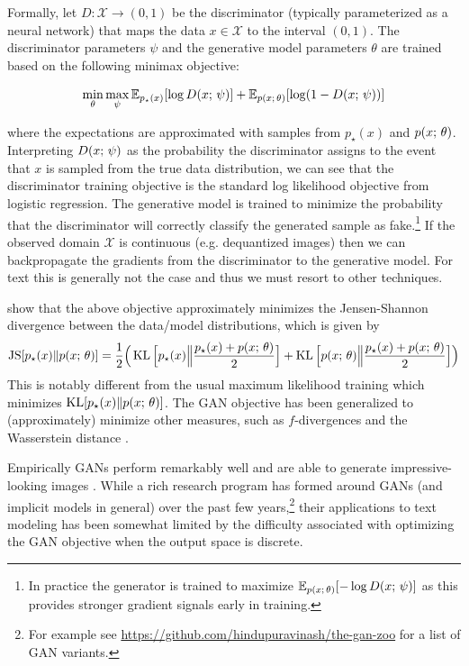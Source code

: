 \documentclass{article}
\begin{document}
Formally, let $D: \mathcal{X} \to (0, 1)$ be the discriminator (typically parameterized as 
a neural network) that maps the data  $x \in \mathcal{X}$ to the interval $(0,1)$. The discriminator parameters $\psi$ and the generative model parameters $\theta$ are trained based on the following
minimax objective:

\[ \min_\theta \max_\psi \mathbb{E}_{p_\star(x)}[\log D(x ; \, \psi)] + \mathbb{E}_{p(x ; \, \theta)}[\log ( 1 - D(x ; \, \psi))]\]

where the expectations are approximated with samples from $p_\star(x)$ and $p(x ; \, \theta)$. Interpreting $D(x ; \, \psi)$ as the probability the discriminator assigns to the event that $x$ is sampled from the true data distribution, we can see that 
the discriminator training objective is the standard log likelihood objective from 
logistic regression. The generative model is trained to minimize the probability that the discriminator will correctly classify the generated sample as fake.\footnote{In practice the generator is trained to maximize $\mathbb{E}_{p(x; \,\theta)}[- \log D(x ; \, \psi)]$ as this provides stronger gradient signals early in training.} If the observed domain $\mathcal{X}$ is continuous (e.g. dequantized images) then we can backpropagate the gradients from the discriminator to the
generative model. For text this is generally not the case and thus we must resort to
other techniques.

\cite{goodfellow2014generative} show that the above objective
approximately minimizes the Jensen-Shannon divergence between the data/model distributions, which is
given by
\[ \operatorname*{JS}[p_\star(x) \Vert p(x ; \, \theta)] = \frac{1}{2}\Big(\operatorname*{KL}\Big[p_\star(x) \Big\Vert \frac{p_\star(x) + p(x ; \, \theta)}{2} \Big] + \operatorname*{KL}\Big[p(x ; \, \theta) \Big\Vert \frac{p_\star(x) + p(x ; \, \theta)}{2} \Big]  \Big) \]
This is notably different from the usual maximum likelihood training which minimizes $\operatorname*{KL}[p_\star(x) \Vert p(x ; \, \theta)]$.
The GAN objective has been generalized to (approximately) minimize other measures, 
such as $f$-divergences \citep{nowozin2016f} and the Wasserstein distance \citep{arjovsky2017wasserstein,tolstikhin2017wasserstein}. 

Empirically GANs perform remarkably well and are able to generate impressive-looking
images \citep{Radford2016,salimans2016,zhang2017stack,miyato2018,Karras2018prog}. While a rich
research program has formed around GANs (and implicit
models in general) over the past few years,\footnote{For example see \url{https://github.com/hindupuravinash/the-gan-zoo} for a list of GAN variants.}
their applications to text modeling has been somewhat limited by the difficulty
associated with optimizing the GAN objective when the output space is discrete.
\end{document}
